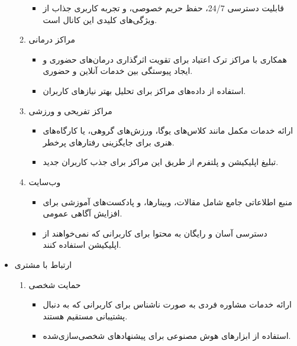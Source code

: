 \documentclass[dvipsnames, svgnames, x11names, 11pt]{article}
\begin{document}
\begin{itemize}
\begin{enumerate}
\begin{itemize}
\item 
قابلیت دسترسی 24/7، حفظ حریم خصوصی، و تجربه کاربری جذاب از ویژگی‌های کلیدی این کانال است.
\end{itemize}

\item 
مراکز درمانی

\begin{itemize}
\item 
همکاری با مراکز ترک اعتیاد برای تقویت اثرگذاری درمان‌های حضوری و ایجاد پیوستگی بین خدمات آنلاین و حضوری.

\item 
استفاده از داده‌های مراکز برای تحلیل بهتر نیازهای کاربران.
\end{itemize}

\item 
مراکز تفریحی و ورزشی

\begin{itemize}
\item 
ارائه خدمات مکمل مانند کلاس‌های یوگا، ورزش‌های گروهی، یا کارگاه‌های هنری برای جایگزینی رفتارهای پرخطر.

\item 
تبلیغ اپلیکیشن و پلتفرم از طریق این مراکز برای جذب کاربران جدید.
\end{itemize}

\item 
وب‌سایت

\begin{itemize}
\item 
منبع اطلاعاتی جامع شامل مقالات، وبینارها، و پادکست‌های آموزشی برای افزایش آگاهی عمومی.

\item 
دسترسی آسان و رایگان به محتوا برای کاربرانی که نمی‌خواهند از اپلیکیشن استفاده کنند.
\end{itemize}
\end{enumerate}

\item 
ارتباط با مشتری

\begin{enumerate}
\item 
حمایت شخصی

\begin{itemize}
\item 
ارائه خدمات مشاوره فردی به صورت ناشناس برای کاربرانی که به دنبال پشتیبانی مستقیم هستند.
\item 
استفاده از ابزارهای هوش مصنوعی برای پیشنهاد‌های شخصی‌سازی‌شده.
\end{itemize}


\end{enumerate}
\end{itemize}
\end{document}
